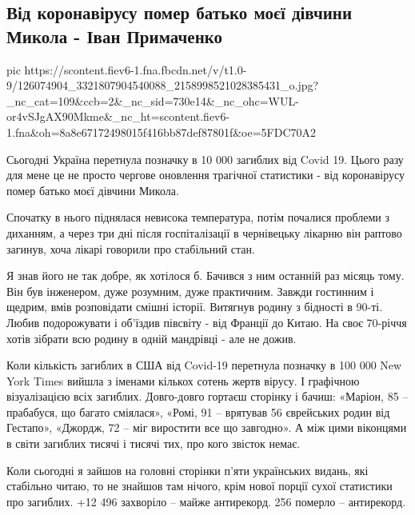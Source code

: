  
 
 

\subsection{Від коронавірусу помер батько моєї дівчини Микола - Іван Примаченко}


\ifcmt
pic https://scontent.fiev6-1.fna.fbcdn.net/v/t1.0-9/126074904_3321807904540088_2158998521028385431_o.jpg?_nc_cat=109&ccb=2&_nc_sid=730e14&_nc_ohc=WUL-or4vSJgAX90Mkme&_nc_ht=scontent.fiev6-1.fna&oh=8a8e67172498015f416bb87def87801f&oe=5FDC70A2
\fi

Сьогодні Україна перетнула позначку в 10 000 загиблих від Covid 19. Цього разу
для мене це не просто чергове оновлення трагічної статистики - від коронавірусу
помер батько моєї дівчини Микола. 

Спочатку в нього піднялася невисока температура, потім почалися проблеми з
диханням, а через три дні після госпіталізації в чернівецьку лікарню він
раптово загинув, хоча лікарі говорили про стабільний стан. 

Я знав його не так добре, як хотілося б. Бачився з ним останній раз місяць
тому. Він був інженером, дуже розумним, дуже практичним. Завжди гостинним і
щедрим, вмів розповідати смішні історії. Витягнув родину з бідності в 90-ті.
Любив подорожувати і об'їздив півсвіту - від Франції до Китаю. На своє 70-річчя
хотів зібрати всю родину в одній мандрівці - але не дожив. 

Коли кількість загиблих в США від Covid-19 перетнула позначку в 100 000 New
York Times вийшла з іменами кількох сотень жертв вірусу. І графічною
візуалізацією всіх загиблих. Довго-довго гортаєш сторінку і бачиш: «Маріон, 85
– прабабуся, що багато сміялася», «Ромі, 91 – врятував 56 єврейських родин від
Гестапо», «Джордж, 72 – міг виростити все що завгодно». А між цими віконцями в
світи загиблих тисячі і тисячі тих, про кого звісток немає. 

Коли сьогодні я зайшов на головні сторінки п’яти українських видань, які
стабільно читаю, то не знайшов там нічого, крім нової порції сухої статистики
про загиблих. +12 496 захворіло – майже антирекорд. 256 померло – антирекорд. 

